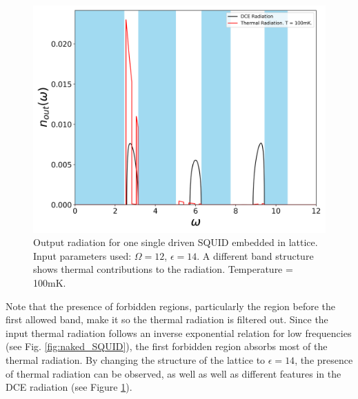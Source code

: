 \begin{figure}[h]
    \includegraphics[width=\textwidth, keepaspectratio]{figures/results/one_SQUID_active_epsilon_14_100mK.png}
    \caption{Output radiation for one single driven SQUID embedded in lattice. Input parameters used: $\Omega=12$, $\epsilon=14$. A different band structure shows thermal contributions to the radiation. Temperature = 100mK.}
    \label{fig:one_SQUID_active_e_14_T_100}
\end{figure}
%
\newpage
Note that the presence of forbidden regions, particularly the region before the first allowed band, make it so the thermal radiation is filtered out. Since the input thermal radiation follows an inverse exponential relation for low frequencies (see Fig. \ref{fig:naked_SQUID}), the first forbidden region absorbs most of the thermal radiation. By changing the structure of the lattice to $\epsilon = 14$, the presence of thermal radiation can be observed, as well as well as different features in the DCE radiation (see Figure \ref{fig:one_SQUID_active_e_14_T_100}).
%
